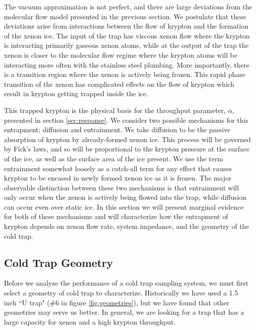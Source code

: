 The vacuum approximation is not perfect, and there are large deviations from the molecular flow model presented in the previous section. We postulate that these deviations arise from interactions between the flow of krypton and the formation of the xenon ice. The input of the trap has viscous xenon flow where the krypton is interacting primarily gaseous xenon atoms, while at the output of the trap the xenon is closer to the molecular flow regime where the krypton atoms will be interacting more often with the stainless steel plumbing. More importantly, there is a transition region where the xenon is actively being frozen. This rapid phase transition of the xenon has complicated effects on the flow of krypton which result in krypton getting trapped inside the ice. 

This trapped krypton is the physical basis for the throughput parameter, $\alpha$, presented in section \ref{sec:response}. We consider two possible mechanisms for this entrapment; diffusion and entrainment. We take diffusion to be the passive absorption of krypton by already-formed xenon ice. This process will be governed by Fick's laws, and so will be proportional to the krypton pressure at the surface of the ice, as well as the surface area of the ice present. We use the term entrainment somewhat loosely as a catch-all term for any effect that causes krypton to be encased in newly formed xenon ice as it is frozen. The major observable distinction between these two mechanisms is that entrainment will only occur when the xenon is actively being flowed into the trap, while diffusion can occur even over static ice. In this section we will present marginal evidence for both of these mechanisms and will characterize how the entrapment of krypton depends on xenon flow rate, system impedance, and the geometry of the cold trap.


\subsection{Cold Trap Geometry}
\label{sec:geometry}
Before we analyze the performance of a cold trap sampling system, we must first select a geometry of cold trap to characterize. Historically we have used a 1.5 inch ``U trap" (\#6 in figure \ref{fig:geometries}), but we have found that other geometries may serve us better. In general, we are looking for a trap that has a large capacity for xenon and a high krypton throughput.

